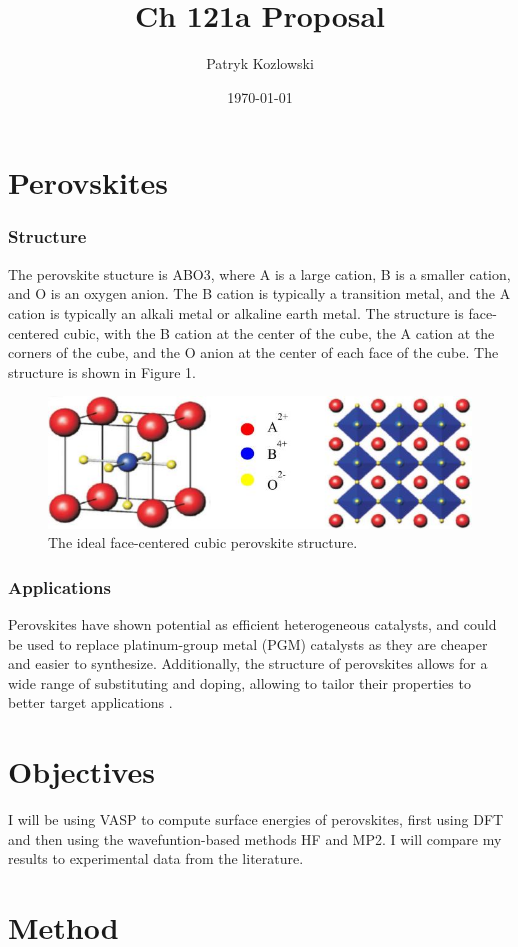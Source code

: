 \documentclass[12pt]{article}
\title{Ch 121a Proposal}
\author{Patryk Kozlowski}
\date{\today}
\begin{document}
\section{Perovskites}
\subsubsection{Structure}
The perovskite stucture is ABO3, where A is a large cation, B is a smaller cation, and O is an oxygen anion. The B cation is typically a transition metal, and the A cation is typically an alkali metal or alkaline earth metal. The structure is face-centered cubic, with the B cation at the center of the cube, the A cation at the corners of the cube, and the O anion at the center of each face of the cube. The structure is shown in Figure 1.
\begin{figure}
\includegraphics[width=\linewidth]{perovskite.png}
\caption{The ideal face-centered cubic perovskite structure. \cite{assirey2019perovskite}}
\label{fig:perovskite}
\end{figure}
\subsubsection{Applications}
Perovskites have shown potential as efficient heterogeneous catalysts, and could be used to replace platinum-group metal (PGM) catalysts as they are cheaper and easier to synthesize. Additionally, the structure of perovskites allows for a wide range of substituting and doping, allowing to tailor their properties to better target applications \cite{royer2014perovskites}.
\section{Objectives}
I will be using VASP to compute surface energies of perovskites, first using DFT and then using the wavefuntion-based methods HF and MP2. I will compare my results to experimental data from the literature.
\section{Method}
\end{document}
